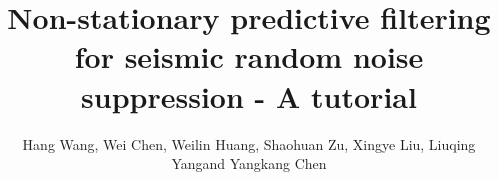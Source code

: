 
\title{Non-stationary predictive filtering for seismic random noise suppression - A tutorial}
\renewcommand{\thefootnote}{\fnsymbol{footnote}}
\author{Hang Wang\footnotemark[1], Wei Chen\footnotemark[2], Weilin Huang\footnotemark[3], Shaohuan Zu\footnotemark[4], Xingye Liu\footnotemark[5], Liuqing Yang\footnotemark[3] and Yangkang Chen\footnotemark[1]}

\address{
\footnotemark[1]
School of Earth Sciences\\
Zhejiang University\\
Hangzhou, Zhejiang Province, China, 310027\\
18328504171@163.com \& chenyk2016@gmail.com \\
\footnotemark[2] Key Laboratory of Exploration Technology for Oil and Gas Resources of Ministry of Education\\
Yangtze University\\
Daxue Road No.111\\
Caidian District\\
Wuhan, China, 430100\\
chenwei2014@yangtzeu.edu.cn\& yangliuqingqin@163.com\\
\footnotemark[3] State Key Laboratory of Petroleum Resources and Prospecting \\
China University of Petroleum \\
Fuxue Road 18th\\
Beijing, China, 102200\\
cup\_hwl@126.com \\
\footnotemark[4] College of Geophysics\\
Chengdu University of Technology \\
Dongsanlu, Erxianqiao, Chengdu 610059, Sichuan, China \\
zushaohuan@qq.com\\
\footnotemark[5] College of Geology and Environment\\
Xi’an University of Science and Technology\\
Xi’an, Shaanxi Province, China, 710054 \\
lwxwyh506673@126.com\\
Corresponding author: Yangkang Chen, chenyk2016@gmail.com
}


\DeclareRobustCommand{\dlo}[1]{}
\DeclareRobustCommand{\wen}[1]{#1}

